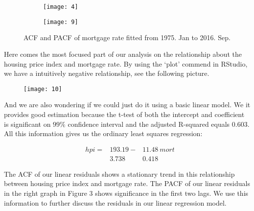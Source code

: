 \documentclass[12pt,letterpaper]{article}
\begin{document}
\begin{figure*}[h!]
\begin{subfigure}[b]{0.4\textwidth}
\begin{center}
 \texttt{[image: 4]}
 \vspace{-0.4cm}
\end{center}
\end{subfigure}
\qquad
\qquad
\begin{subfigure}[b]{0.4\textwidth}
\begin{center}
 \texttt{[image: 9]}
 \vspace{-0.4cm}
\end{center}
\end{subfigure}
 \vspace{-.1cm}
 \caption{ ACF and PACF of mortgage rate fitted from 1975. Jan to 2016. Sep.}
      \label{fig:time}
\vspace{-.25cm}
\end{figure*}

Here comes the most focused part of our analysis on the relationship about the housing price index and mortgage rate. 
By using the `plot' commend in RStudio, we have a intuitively negative relationship, see the following picture.

\begin{figure}[h!]
\centering
 \texttt{[image: 10]}\\
\end{figure}

And we are also wondering if we could just do it using a basic linear model. 
We it provides good estimation because the t-test of both the intercept and coefficient is significant on $99\%$ confidence interval and the adjusted R-squared equals 0.603. 
All this information gives us the ordinary least squares regression:

\begin{equation}
\begin{aligned}
&hpi =&193.19  -  &11.48 { \ }mort \\
&        & 3.738   \quad&0.418
\end{aligned}
\end{equation}

The ACF of our linear residuals shows a stationary trend in this relationship between housing price index and mortgage rate. 
The PACF of our linear residuals in the right graph in Figure 3 shows significance in the first two lags.
We use this information to further discuss the residuals in our linear regression model.
\end{document}
